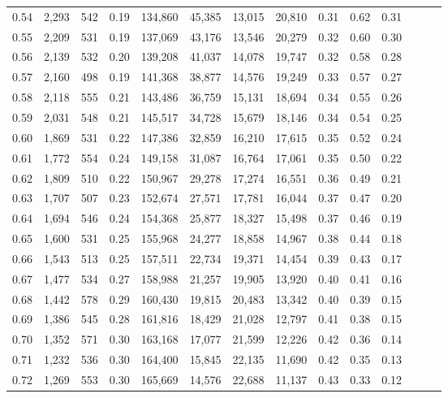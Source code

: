 \begin{tabular}{rrrrrrrrrrrrrr}
0.54 &  2,293 &  542 &  0.19 &  134,860 &   45,385 &  13,015 &  20,810 &  0.31 &  0.62 &      0.31 \\
0.55 &  2,209 &  531 &  0.19 &  137,069 &   43,176 &  13,546 &  20,279 &  0.32 &  0.60 &      0.30 \\
0.56 &  2,139 &  532 &  0.20 &  139,208 &   41,037 &  14,078 &  19,747 &  0.32 &  0.58 &      0.28 \\
0.57 &  2,160 &  498 &  0.19 &  141,368 &   38,877 &  14,576 &  19,249 &  0.33 &  0.57 &      0.27 \\
0.58 &  2,118 &  555 &  0.21 &  143,486 &   36,759 &  15,131 &  18,694 &  0.34 &  0.55 &      0.26 \\
0.59 &  2,031 &  548 &  0.21 &  145,517 &   34,728 &  15,679 &  18,146 &  0.34 &  0.54 &      0.25 \\
0.60 &  1,869 &  531 &  0.22 &  147,386 &   32,859 &  16,210 &  17,615 &  0.35 &  0.52 &      0.24 \\
0.61 &  1,772 &  554 &  0.24 &  149,158 &   31,087 &  16,764 &  17,061 &  0.35 &  0.50 &      0.22 \\
0.62 &  1,809 &  510 &  0.22 &  150,967 &   29,278 &  17,274 &  16,551 &  0.36 &  0.49 &      0.21 \\
0.63 &  1,707 &  507 &  0.23 &  152,674 &   27,571 &  17,781 &  16,044 &  0.37 &  0.47 &      0.20 \\
0.64 &  1,694 &  546 &  0.24 &  154,368 &   25,877 &  18,327 &  15,498 &  0.37 &  0.46 &      0.19 \\
0.65 &  1,600 &  531 &  0.25 &  155,968 &   24,277 &  18,858 &  14,967 &  0.38 &  0.44 &      0.18 \\
0.66 &  1,543 &  513 &  0.25 &  157,511 &   22,734 &  19,371 &  14,454 &  0.39 &  0.43 &      0.17 \\
0.67 &  1,477 &  534 &  0.27 &  158,988 &   21,257 &  19,905 &  13,920 &  0.40 &  0.41 &      0.16 \\
0.68 &  1,442 &  578 &  0.29 &  160,430 &   19,815 &  20,483 &  13,342 &  0.40 &  0.39 &      0.15 \\
0.69 &  1,386 &  545 &  0.28 &  161,816 &   18,429 &  21,028 &  12,797 &  0.41 &  0.38 &      0.15 \\
0.70 &  1,352 &  571 &  0.30 &  163,168 &   17,077 &  21,599 &  12,226 &  0.42 &  0.36 &      0.14 \\
0.71 &  1,232 &  536 &  0.30 &  164,400 &   15,845 &  22,135 &  11,690 &  0.42 &  0.35 &      0.13 \\
0.72 &  1,269 &  553 &  0.30 &  165,669 &   14,576 &  22,688 &  11,137 &  0.43 &  0.33 &      0.12 \\

\end{tabular}
